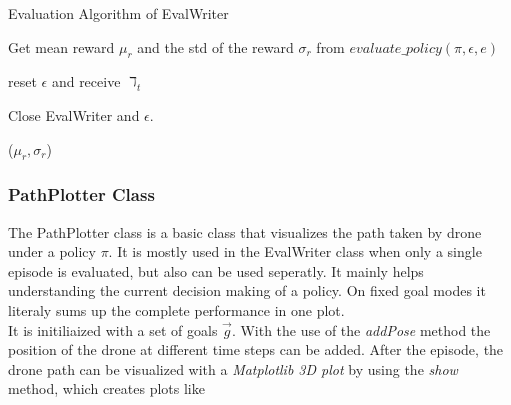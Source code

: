 \newpage

\begin{algorithm}
	\caption{Evaluation Algorithm of EvalWriter}
	\label{alg:evalwriter}
	
	Get mean reward $\mu_r$ and the std of the reward $\sigma_r$ from $evaluate\_policy (\pi , \epsilon, e)$
	
	reset $\epsilon$ and receive $\daleth_t$
	
	Close EvalWriter and $\epsilon$.
	
	\Return ($\mu_r, \sigma_r$)
	
\end{algorithm} 

\subsubsection{PathPlotter Class}
The PathPlotter class is a basic class that visualizes the path taken by drone under a policy $\pi$. 
It is mostly used in the EvalWriter class when only a single episode is evaluated, but also can be used seperatly.
It mainly helps understanding the current decision making of a policy. On fixed goal modes it literaly sums up the complete performance in one plot.\\
 It is initiliaized with a set of goals $\overrightarrow{g}$. With the use of the \emph{addPose} method the position of the drone at different time steps can be added. After the episode, the drone path can be visualized with a \emph{Matplotlib 3D plot} by using the \emph{show} method, which creates plots like %
